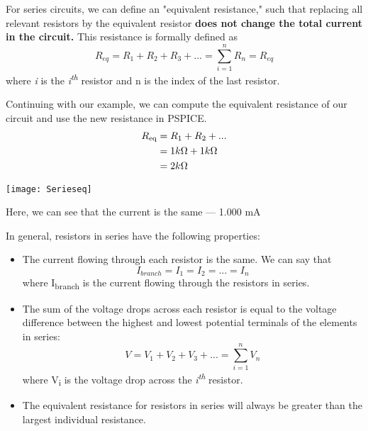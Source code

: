 \documentclass[12pt,letterpaper]{article}
\begin{document}
For series circuits, we can define an "equivalent resistance," such that replacing all relevant resistors by the equivalent resistor \textbf{does not change the total current in the circuit.} This resistance is formally defined as \begin{equation} R_{eq} = R_{1} + R_{2} + R_{3} + ... = \sum_{i=1}^{n} R_{n} = R_{eq} \end{equation}
where \textit{i} is the \textit{i\textsuperscript{th}} resistor and n is the index of the last resistor. \par 

Continuing with our example, we can compute the equivalent resistance of our circuit and use the new resistance in PSPICE.
\begin{equation}
\begin{split}
 R\textsubscript{eq} &= R\textsubscript{1} + R\textsubscript{2} + ... \\
&= 1k\Omega + 1k\Omega \\
&= 2k\Omega 
\end{split}
\end{equation}

\begin{center}
\texttt{[image: Serieseq]}
\end{center}

Here, we can see that the current is the same --- 1.000 mA

In general, resistors in series have the following properties:
\begin{itemize}
\item The current flowing through each resistor is the same. We can say that 
	\begin{equation} I_{branch} = I_{1} = I_{2} = ... = I_{n} \end{equation}
	where I\textsubscript{branch} is the current flowing through the resistors in series.
\item The sum of the voltage drops across each resistor is equal to the voltage difference between the highest and lowest potential terminals of the elements in series: 
	\begin{equation} V = V_{1} + V_{2} + V_{3} + ... = \sum_{i=1}^{n} V_{n} \end{equation} where V\textsubscript{i} is the voltage drop across the \textit{i\textsuperscript{th}} resistor.

\item The equivalent resistance for resistors in series will always be greater than the largest individual resistance.
\end{itemize}
\end{document}

